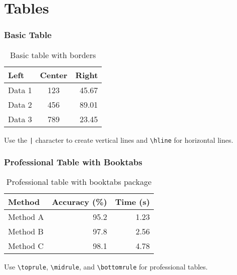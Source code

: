 \documentclass[aspectratio=169,professionalfonts]{beamer}
\begin{document}
\section{Tables}

\begin{frame}
    \frametitle{Basic Table}
    
    \begin{table}
        \centering
        \begin{tabular}{|l|c|r|}
            \hline
            \textbf{Left} & \textbf{Center} & \textbf{Right} \\
            \hline
            Data 1 & 123 & 45.67 \\
            Data 2 & 456 & 89.01 \\
            Data 3 & 789 & 23.45 \\
            \hline
        \end{tabular}
        \caption{Basic table with borders}
    \end{table}
    
    \vspace{1em}
    
    \begin{tcolorbox}[colback=ugmLightGrey,colframe=ugmBlue,title=Table Usage Tip]
        Use the \texttt{|} character to create vertical lines and \texttt{\textbackslash hline} for horizontal lines.
    \end{tcolorbox}
\end{frame}

\begin{frame}
    \frametitle{Professional Table with Booktabs}
    
    \begin{table}
        \centering
        \begin{tabular}{lrr}
            \toprule
            \textbf{Method} & \textbf{Accuracy (\%)} & \textbf{Time (s)} \\
            \midrule
            Method A & 95.2 & 1.23 \\
            Method B & 97.8 & 2.56 \\
            Method C & 98.1 & 4.78 \\
            \bottomrule
        \end{tabular}
        \caption{Professional table with booktabs package}
    \end{table}
    
    \begin{tcolorbox}[colback=ugmLightGrey,colframe=ugmBlue,title=Booktabs Tip]
        Use \texttt{\textbackslash toprule}, \texttt{\textbackslash midrule}, and \texttt{\textbackslash bottomrule} for professional tables.
    \end{tcolorbox}
\end{frame}
\end{document}
